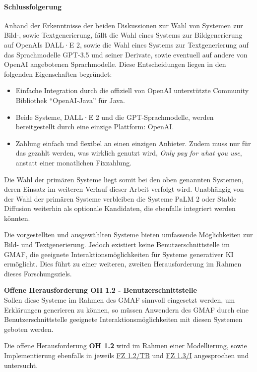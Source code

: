 \paragraph{Schlussfolgerung}
Anhand der Erkenntnisse der beiden Diskussionen zur Wahl von Systemen zur Bild-, sowie Textgenerierung, fällt die Wahl eines Systems zur Bildgenerierung auf OpenAIs DALL·E 2, sowie die Wahl eines Systems zur Textgenerierung auf das Sprachmodelle GPT-3.5 und seiner Derivate, sowie eventuell auf andere von OpenAI angebotenen Sprachmodelle.
Diese Entscheidungen liegen in den folgenden Eigenschaften begründet:
\begin{itemize}
    \item Einfache Integration durch die offiziell von OpenAI unterstützte Community Bibliothek \enquote{OpenAI-Java} \cite{dall-e-java-api} für Java.
    \item Beide Systeme, DALL·E 2 und die GPT-Sprachmodelle, werden bereitgestellt durch eine einzige Plattform: OpenAI.
    \item Zahlung einfach und flexibel an einen einzigen Anbieter. 
    Zudem muss nur für das gezahlt werden, was wirklich genutzt wird, \textit{Only pay for what you use}, anstatt einer monatlichen Fixzahlung.
\end{itemize}
Die Wahl der primären Systeme liegt somit bei den oben genannten Systemen, deren Einsatz im weiteren Verlauf dieser Arbeit verfolgt wird.
Unabhängig von der Wahl der primären Systeme verbleiben die Systeme PaLM 2 oder Stable Diffusion weiterhin als optionale Kandidaten, die ebenfalls integriert werden könnten.

Die vorgestellten und ausgewählten Systeme bieten umfassende Möglichkeiten zur Bild- und Textgenerierung.
Jedoch existiert keine Benutzerschnittstelle im GMAF, die geeignete Interaktionsmöglichkeiten für Systeme generativer KI ermöglicht.
Dies führt zu einer weiteren, zweiten Herausforderung im Rahmen dieses Forschungsziels.

\begin{tcolorbox}[minipage, colback=white, colframe=black, arc=0pt, outer arc=0pt]
    \textbf{Offene Herausforderung OH 1.2 - Benutzerschnittstelle} \\
    Sollen diese Systeme im Rahmen des GMAF sinnvoll eingesetzt werden, um Erklärungen generieren zu können, so müssen Anwendern des GMAF durch eine Benutzerschnittstelle geeignete Interaktionsmöglichkeiten mit diesen Systemen geboten werden.
\end{tcolorbox}
Die offene Herausforderung \textbf{OH 1.2} wird im Rahmen einer Modellierung, sowie Implementierung ebenfalls in jeweils \hyperref[sec3:model:subsec:fz-explainability]{FZ 1.2/TB} und \hyperref[sec4:impl:subsec:fz-explainability]{FZ 1.3/I} angesprochen und untersucht. 

